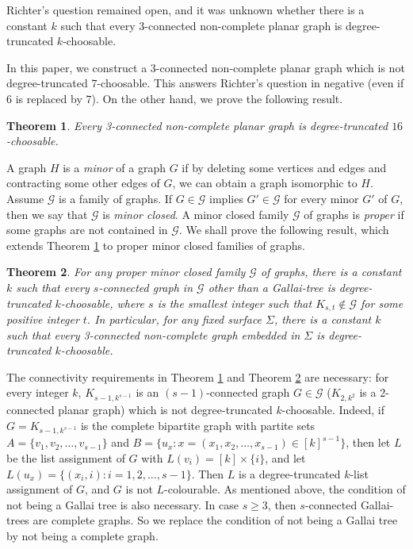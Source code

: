 \documentclass[11pt,a4paper]{article}
\newtheorem{theorem}{Theorem}
\theoremstyle{definition}
\begin{document}
  Richter's question remained open, and it was unknown whether there is a constant $k$ such that every 3-connected non-complete planar graph is degree-truncated $k$-choosable. 
  
In this paper, we construct a 3-connected non-complete planar graph which is not degree-truncated $7$-choosable. This answers Richter's question in negative (even if $6$ is replaced by $7$). On the other hand, we prove the following result.

\begin{theorem}
    \label{thm-planar}
    Every 3-connected non-complete planar graph is degree-truncated $16$-choosable.
\end{theorem} 

A graph $H$ is a {\em minor} of a graph $G$ if by deleting some vertices and edges and contracting some other edges of $G$, we can obtain a graph isomorphic to $H$.
Assume ${\mathcal G}$ is a family of graphs. If $G \in \mathcal{G}$  implies $G' \in \mathcal{G}$ for every minor $G'$ of $G$, then we say that $\mathcal{G}$ is {\em minor closed}. A minor closed family $\mathcal{G}$ of graphs is {\em proper} if some graphs are not contained in $\mathcal{G}$.  We shall prove the following result, which extends Theorem \ref{thm-planar} to proper minor closed families of graphs.

\begin{theorem}
    \label{thm-minor}
    For any proper minor closed family $\mathcal{G}$ of graphs, there is a constant $k$  such that every $s$-connected   graph in $\mathcal{G}$ other than a Gallai-tree is degree-truncated $k$-choosable, where $s$ is the smallest integer such that $K_{s,t} \notin \mathcal{G}$ for some positive integer $t$. In particular, for any fixed surface $\Sigma$, there is a constant $k$ such that every 3-connected non-complete graph embedded in $\Sigma$ is degree-truncated $k$-choosable. 
\end{theorem}
 
The connectivity requirements in Theorem \ref{thm-planar} and Theorem \ref{thm-minor}  are necessary: for every integer $k$, $K_{s-1, k^{s-1}}$ is an $(s-1)$-connected graph $G \in \mathcal{G}$ ($K_{2, k^2}$ is a 2-connected planar graph) which is not degree-truncated $k$-choosable. 
 Indeed, if   $G = K_{s-1, k^{s-1}}$ is the complete bipartite graph with partite sets $A=\{v_1, v_2,\ldots, v_{s-1}\}$ and $B=\{u_x: x=(x_1,x_2,\ldots, x_{s-1}) \in [k]^{s-1}\}$, then let $L$ be the list assignment of $G$ with $L(v_i) = [k] \times \{i\}$, and let $L(u_x) = \{(x_i,i): i=1,2,\ldots, s-1\}$. Then $L$ is a degree-truncated $k$-list assignment of $G$, and $G$ is not $L$-colourable.  
As mentioned above, the condition of not being a Gallai tree is also necessary. In case $s \ge 3$, then $s$-connected Gallai-trees are complete graphs. So we replace the condition of not being a Gallai tree by not being a complete graph. 
\end{document}
